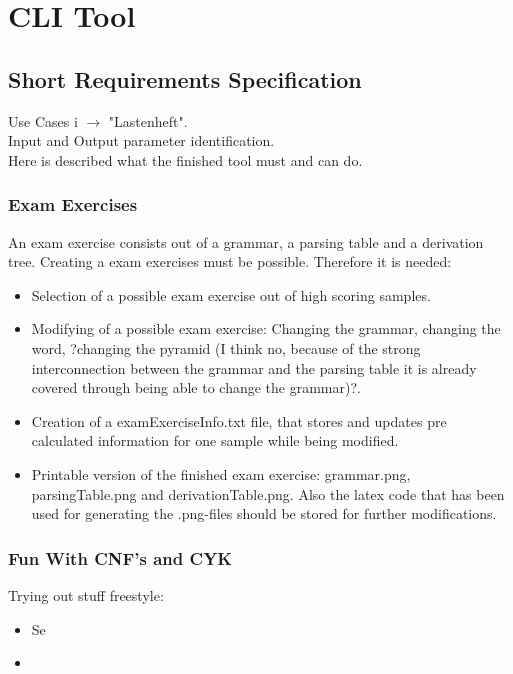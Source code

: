 
\section{CLI Tool}

\subsection{Short Requirements Specification}
Use Cases i $\longrightarrow$ "Lastenheft".\\
Input and Output parameter identification.\\
Here is described what the finished tool must and can do.\\

\subsubsection{Exam Exercises}
An exam exercise consists out of a grammar, a parsing table and a derivation tree. Creating a exam exercises must be possible. Therefore it is needed:
\begin{itemize}
	\item Selection of a possible exam exercise out of high scoring samples.
	\item Modifying of a possible exam exercise: Changing the grammar, changing the word, ?changing the pyramid (I think no, because of the strong interconnection between the grammar and the parsing table it is already covered through being able to change the grammar)?.
	\item Creation of a examExerciseInfo.txt file, that stores and updates pre calculated information for one sample while being modified. 
	\item Printable version of the finished exam exercise: grammar.png, parsingTable.png and derivationTable.png. Also the latex code that has been used for generating the .png-files should be stored for further modifications.
\end{itemize}

\subsubsection{Fun With CNF's and CYK}
Trying out stuff freestyle:
\begin{itemize}
	\item Se
	\item 
\end{itemize}


